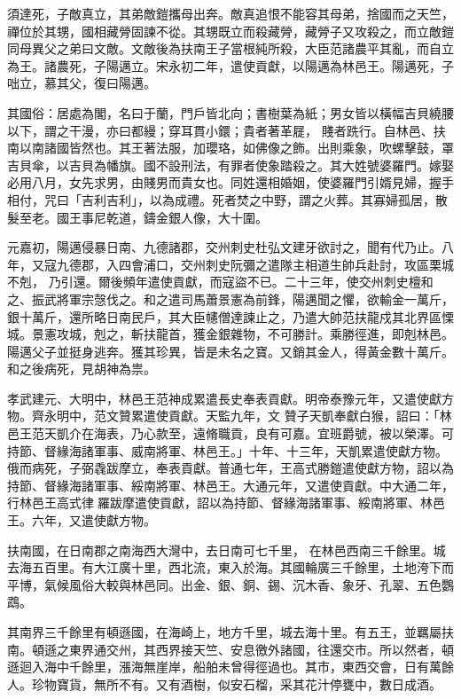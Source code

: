 \begin{pinyinscope}
 須達死，子敵真立，其弟敵鎧攜母出奔。敵真追恨不能容其母弟，捨國而之天竺，禪位於其甥，國相藏膋固諫不從。其甥既立而殺藏膋，藏膋子又攻殺之，而立敵鎧同母異父之弟曰文敵。文敵後為扶南王子當根純所殺，大臣范諸農平其亂，而自立為王。諸農死，子陽邁立。宋永初二年，遣使貢獻，以陽邁為林邑王。陽邁死，子咄立，慕其父，復曰陽邁。



 其國俗：居處為閣，名曰于蘭，門戶皆北向；書樹葉為紙；男女皆以橫幅吉貝繞腰以下，謂之干漫，亦曰都縵；穿耳貫小鐶；貴者著革屣，
 賤者跣行。自林邑、扶南以南諸國皆然也。其王著法服，加瓔珞，如佛像之飾。出則乘象，吹螺擊鼓，罩吉貝傘，以吉貝為幡旗。國不設刑法，有罪者使象踏殺之。其大姓號婆羅門。嫁娶必用八月，女先求男，由賤男而貴女也。同姓還相婚姻，使婆羅門引婿見婦，握手相付，咒曰「吉利吉利」，以為成禮。死者焚之中野，謂之火葬。其寡婦孤居，散髮至老。國王事尼乾道，鑄金銀人像，大十圍。



 元嘉初，陽邁侵暴日南、九德諸郡，交州刺史杜弘文建牙欲討之，聞有代乃止。八年，又寇九德郡，入四會浦口，交州刺史阮彌之遣隊主相道生帥兵赴討，攻區栗城不剋，
 乃引還。爾後頻年遣使貢獻，而寇盜不已。二十三年，使交州刺史檀和之、振武將軍宗愨伐之。和之遣司馬蕭景憲為前鋒，陽邁聞之懼，欲輸金一萬斤，銀十萬斤，還所略日南民戶，其大臣幰僧達諫止之，乃遣大帥范扶龍戍其北界區慄城。景憲攻城，剋之，斬扶龍首，獲金銀雜物，不可勝計。乘勝徑進，即剋林邑。陽邁父子並挺身逃奔。獲其珍異，皆是未名之寶。又銷其金人，得黃金數十萬斤。和之後病死，見胡神為祟。



 孝武建元、大明中，林邑王范神成累遣長史奉表貢獻。明帝泰豫元年，又遣使獻方物。齊永明中，范文贊累遣使貢獻。天監九年，文
 贊子天凱奉獻白猴，詔曰：「林邑王范天凱介在海表，乃心款至，遠脩職貢，良有可嘉。宜班爵號，被以榮澤。可持節、督緣海諸軍事、威南將軍、林邑王。」十年、十三年，天凱累遣使獻方物。俄而病死，子弼毳跋摩立，奉表貢獻。普通七年，王高式勝鎧遣使獻方物，詔以為持節、督緣海諸軍事、綏南將軍、林邑王。大通元年，又遣使貢獻。中大通二年，行林邑王高式律羅跋摩遣使貢獻，詔以為持節、督緣海諸軍事、綏南將軍、林邑王。六年，又遣使獻方物。



 扶南國，在日南郡之南海西大灣中，去日南可七千里，
 在林邑西南三千餘里。城去海五百里。有大江廣十里，西北流，東入於海。其國輪廣三千餘里，土地洿下而平博，氣候風俗大較與林邑同。出金、銀、銅、錫、沉木香、象牙、孔翠、五色鸚鵡。



 其南界三千餘里有頓遜國，在海崎上，地方千里，城去海十里。有五王，並羈屬扶南。頓遜之東界通交州，其西界接天竺、安息徼外諸國，往還交市。所以然者，頓遜迴入海中千餘里，漲海無崖岸，船舶未曾得徑過也。其市，東西交會，日有萬餘人。珍物寶貨，無所不有。又有酒樹，似安石榴，采其花汁停甕中，數日成酒。




\end{pinyinscope}
